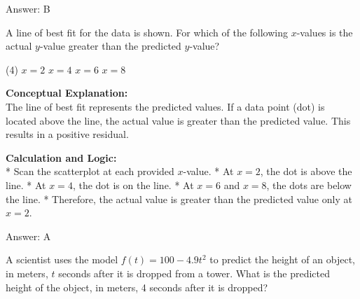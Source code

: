 \documentclass[11pt,paper=a4,answers]{exam}
\begin{document}
\begin{questions}
\begin{solution}
Answer: \colorbox{yellow!100}{B}
\end{solution}

\vspace{60pt}

\question
\begin{center}
\end{center}
A line of best fit for the data is shown. For which of the following $x$-values is the actual $y$-value greater than the predicted $y$-value?
\begin{tasks}(4)
    \task $x = 2$
    \task $x = 4$
    \task $x = 6$
    \task $x = 8$
\end{tasks}

\begin{solution}
\textbf{Conceptual Explanation:} \\
The line of best fit represents the predicted values. If a data point (dot) is located above the line, the actual value is greater than the predicted value. This results in a positive residual.

\vspace{30pt}

\textbf{Calculation and Logic:} \\
* Scan the scatterplot at each provided $x$-value.
* At $x = 2$, the dot is above the line.
* At $x = 4$, the dot is on the line.
* At $x = 6$ and $x = 8$, the dots are below the line.
* Therefore, the actual value is greater than the predicted value only at $x = 2$.

\vspace{30pt}

Answer: \colorbox{yellow!100}{A}
\end{solution}

\vspace{60pt}

\question
A scientist uses the model $f(t) = 100 - 4.9t^2$ to predict the height of an object, in meters, $t$ seconds after it is dropped from a tower. What is the predicted height of the object, in meters, 4 seconds after it is dropped?


\end{questions}
\end{document}
